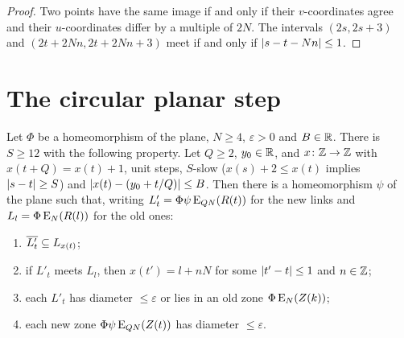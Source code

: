 \begin{proof}
Two points have the same image if and only if their $v$-coordinates agree and their $u$-coordinates differ by a multiple of $2N$. The intervals $(2s,2s+3)$ and
$(2t+2Nn,2t+2Nn+3)$ meet if and only if $\left\lvert s-t-Nn\right\rvert\le1$.
\end{proof}


\section{The circular planar step}

\begin{theorem}\label{thm:circ-step}
Let $\Phi$ be a homeomorphism of the plane, $N\ge4$, $\varepsilon>0$ and $B\in\mathbb{R}$. There is $S\ge12$ with the following property. Let $Q\ge2$, $y_0\in\mathbb{R}$, and $x\colon\mathbb{Z}\to\mathbb{Z}$ with
$x(t+Q)=x(t)+1$, unit steps, $S$-slow ($x(s)+2\le x(t)$ implies $\left\lvert s-t\right\rvert\ge S$) and $\left\lvert x(t)-(y_0+t/Q)\right\rvert\le B$. Then there is a homeomorphism $\psi$ of the plane such that,
writing $L'_t=\Phi\psi\operatorname{E}_{QN}(R(t))$ for the new links and $L_l=\Phi\operatorname{E}_N(R(l))$ for the old ones:
\begin{enumerate}[label=(\arabic*)]
\item $\overline{L'_t}\subseteq L_{x(t)}$;
\item if $L'_t$ meets $L_l$, then $x(t')=l+nN$ for some $\left\lvert t'-t\right\rvert\le1$ and $n\in\mathbb{Z}$;
\item each $L'_t$ has diameter $\le\varepsilon$ or lies in an old zone $\Phi\operatorname{E}_N(Z(k))$;
\item each new zone $\Phi\psi\operatorname{E}_{QN}(Z(t))$ has diameter $\le\varepsilon$.
\end{enumerate}
\end{theorem}


